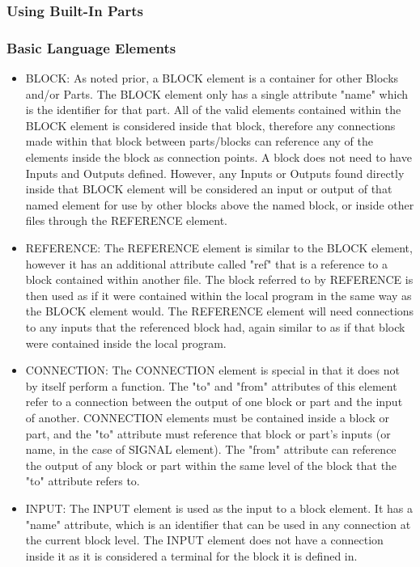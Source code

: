 \subsubsection{Using Built-In Parts}
\subsubsection{Basic Language Elements}
\begin{itemize}[label={}]
    \item BLOCK:
As noted prior, a BLOCK element is a container for other Blocks and/or Parts.
The BLOCK element only has a single attribute "name" which is the identifier for that part.
All of the valid elements contained within the BLOCK element is considered inside that block, therefore any connections made within that block between parts/blocks can reference any of the elements inside the block as connection points. A block does not need to have Inputs and Outputs defined. However, any Inputs or Outputs found directly inside that BLOCK element will be considered an input or output of that named element for use by other blocks above the named block, or inside other files through the REFERENCE element.
    \item REFERENCE:
The REFERENCE element is similar to the BLOCK element, however it has an additional attribute called "ref" that is a reference to a block contained within another file.
The block referred to by REFERENCE is then used as if it were contained within the local program in the same way as the BLOCK element would.
The REFERENCE element will need connections to any inputs that the referenced block had, again similar to as if that block were contained inside the local program.
    \item CONNECTION:
The CONNECTION element is special in that it does not by itself perform a function.
The "to" and "from" attributes of this element refer to a connection between the output of one block or part and the input of another.
CONNECTION elements must be contained inside a block or part, and the "to" attribute must reference that block or part's inputs (or name, in the case of SIGNAL element).
The "from" attribute can reference the output of any block or part within the same level of the block that the "to" attribute refers to.
    \item INPUT:
The INPUT element is used as the input to a block element.
It has a "name" attribute, which is an identifier that can be used in any connection at the current block level.
The INPUT element does not have a connection inside it as it is considered a terminal for the block it is defined in.

\end{itemize}
